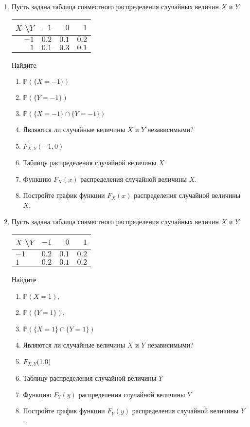 \documentclass[12pt]{article}
\def \P{\mathbb{P}}
\begin{document}
\begin{enumerate}

\item Пусть задана таблица совместного распределения случайных величин $X$ и $Y$. 

\begin{center}\begin{tabular}{r|rrr}
\toprule
 $X$ \textbackslash $Y$    & $-1$  & $0$   & $1$   \\ \midrule
$-1$                 & $0.2$ & $0.1$ & $0.2$ \\ 
 $1$                 & $0.1$ & $0.3$ & $0.1$ \\ \bottomrule
\end{tabular}\end{center}


Найдите
\begin{enumerate}
\item $\P(\{X = -1\})$
\item $\P(\{Y = -1\})$
\item $\P(\{X = -1\}\cap\{Y = -1\})$
\item Являются ли случайные величины $X$ и $Y$ независимыми?
\item $F_{X,Y}(-1,0)$
\item Таблицу распределения случайной величины $X$
\item Функцию $F_{X}(x)$ распределения случайной величины $X$.
\item Постройте график функции $F_{X}(x)$ распределения случайной величины $X$.
\end{enumerate}

\item Пусть задана таблица совместного распределения случайных величин $X$ и $Y$. 


\begin{center}\begin{tabular}{l|rrr}
\toprule
 $X$ \textbackslash $Y$    & $-1$  & $0$  & $1$   \\ \midrule
$-1$                 & $0.2$ & $0.1$ & $0.2$ \\ 
 $1$                 & $0.2$ & $0.1$ & $0.2$ \\ \bottomrule
\end{tabular}\end{center}

Найдите
\begin{enumerate}
\item $\P(X = 1)$,  
\item $\P(\{Y = 1\})$,  
\item $\P(\{X = 1\}\cap\{Y = 1\})$  
\item Являются ли случайные величины $X$ и $Y$ независимыми?  
\item $F_{X,Y}$(1,0)  
\item Таблицу распределения случайной величины $Y$
\item Функцию $F_{Y}(y)$ распределения случайной величины $Y$
\item Постройте график функции $F_{Y}(y)$ распределения случайной величины $Y$.  
\end{enumerate}


\end{enumerate}
\end{document}
